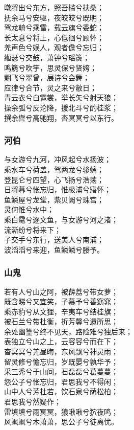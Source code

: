 \documentclass[]{article}
\begin{document}
暾将出兮东方，照吾槛兮扶桑；\\
抚余马兮安驱，夜皎皎兮既明；\\
驾龙輈兮乘雷，载云旗兮委蛇；\\
长太息兮将上，心低徊兮顾怀；\\
羌声色兮娱人，观者儋兮忘归；\\
縆瑟兮交鼓，萧钟兮瑶簴；\\
鸣篪兮吹竽，思灵保兮贤姱；\\
翾飞兮翠曾，展诗兮会舞；\\
应律兮合节，灵之来兮敝日；\\
青云衣兮白霓裳，举长矢兮射天狼；\\
操余弧兮反沦降，援北斗兮酌桂浆；\\
撰余辔兮高驰翔，杳冥冥兮以东行。

\hypertarget{header-n2812}{%
\subsubsection{河伯}\label{header-n2812}}

与女游兮九河，冲风起兮水扬波；\\
乘水车兮荷盖，驾两龙兮骖螭；\\
登昆仑兮四望，心飞扬兮浩荡；\\
日将暮兮怅忘归，惟极浦兮寤怀；\\
鱼鳞屋兮龙堂，紫贝阙兮珠宫；\\
灵何惟兮水中；\\
乘白鼋兮逐文鱼，与女游兮河之渚；\\
流澌纷兮将来下；\\
子交手兮东行，送美人兮南浦；\\
波滔滔兮来迎，鱼鳞鳞兮媵予。

\hypertarget{header-n2817}{%
\subsubsection{山鬼}\label{header-n2817}}

若有人兮山之阿，被薜荔兮带女萝；\\
既含睇兮又宜笑，子慕予兮善窈窕；\\
乘赤豹兮从文狸，辛夷车兮结桂旗；\\
被石兰兮带杜衡，折芳馨兮遗所思；\\
余处幽篁兮终不见天，路险难兮独后来；\\
表独立兮山之上，云容容兮而在下；\\
杳冥冥兮羌昼晦，东风飘兮神灵雨；\\
留灵修兮憺忘归，岁既晏兮孰华予；\\
采三秀兮于山间，石磊磊兮葛蔓蔓；\\
怨公子兮怅忘归，君思我兮不得闲；\\
山中人兮芳杜若，饮石泉兮荫松柏；\\
君思我兮然疑作；\\
雷填填兮雨冥冥，猿啾啾兮狖夜鸣；\\
风飒飒兮木萧萧，思公子兮徒离忧。
\end{document}
